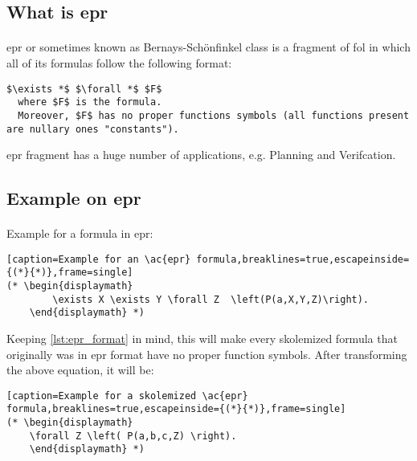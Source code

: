 \subsection{What is \ac{epr}}\label{sub:c2s2s1}
\paragraph{}
\acf{epr} or sometimes known as Bernays-Sch\"onfinkel class is a fragment of \acf{fol} in which all of its formulas follow the following format:

\begin{lstlisting}[caption=Format of \ac{epr} formula,label={lst:epr_format},breaklines=true,mathescape,frame=single]
                          $\exists *$ $\forall *$ $F$
  where $F$ is the formula.
  Moreover, $F$ has no proper functions symbols (all functions present are nullary ones "constants").
\end{lstlisting}

\ac{epr} fragment has a huge number of applications, e.g. Planning and Verifcation. 


\subsection{Example on \ac{epr}}\label{sub:c2s2s2}
\paragraph{}
Example for a formula in \ac{epr}:

\begin{lstlisting}[caption=Example for an \ac{epr} formula,breaklines=true,escapeinside={(*}{*)},frame=single]
(* \begin{displaymath}
		\exists X \exists Y \forall Z  \left(P(a,X,Y,Z)\right).
	\end{displaymath} *)
\end{lstlisting}


Keeping \ref{lst:epr_format} in mind, this will make every skolemized formula that originally was in \ac{epr} format have no proper function symbols. After transforming the above equation, it will be:

\begin{lstlisting}[caption=Example for a skolemized \ac{epr} formula,breaklines=true,escapeinside={(*}{*)},frame=single]
(* \begin{displaymath}
	\forall Z \left( P(a,b,c,Z) \right).
	\end{displaymath} *)
\end{lstlisting}




